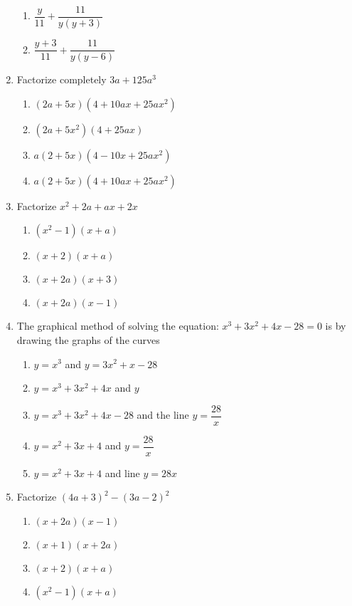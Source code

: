 \begin{multicols}{2}
\begin{enumerate}[label={\arabic*.}]
\begin{enumerate}[label={\Alph*.}]
        \item \(\dfrac{y}{11} + \dfrac{11}{y(y+3)}\)
        \item \(\dfrac{y+3}{11}+\dfrac{11}{y(y-6)}\)
      \end{enumerate}
    \item Factorize completely \(3a+125a^3\)
      \begin{enumerate}[label={\Alph*.}]
        \item \((2a+5x)(4+10ax + 25a{x}^{2})\)
        \item \((2a+5{x}^{2})(4+25ax)\)
        \item \(a(2+5x)(4-10x+25a{x}^{2})\)
        \item \(a(2+5x)(4+10ax+25a{x}^{2})\)
      \end{enumerate}
    \item Factorize \({x}^{2}+2a+ax+2x\)
      \begin{enumerate}[label={\Alph*.}]
        \item \(({x}^{2}-1)(x+a)\)
        \item \((x+2)(x+a)\)
        \item \((x+2a)(x+3)\)
        \item \((x+2a)(x-1)\)
      \end{enumerate}
    \item The graphical method of solving the equation: \({x}^{3}+3{x}^{2}+4x-28 = 0\) is by drawing the graphs of the curves
      \begin{enumerate}[label={\Alph*.}]
        \item \(y = {x}^{3}\) and \(y=3{x}^{2} + x -28\)
        \item \(y = {x}^{3}+3{x}^{2}+4x\) and \(y\)
        \item \(y = {x}^{3}+3{x}^{2}+4x-28\) and the line \(y=\dfrac{28}{x}\)
        \item \(y = {x}^{2}+3x+4\) and \(y = \dfrac{28}{x}\)
        \item \(y = {x}^{2}+3x+4\) and line \(y = 28x\)
      \end{enumerate}
    \item Factorize \({(4a+3)}^2-{(3a-2)}^2\)
      \begin{enumerate}[label={\Alph*.}]
        \item \((x+2a)(x-1)\)
        \item \((x+1)(x+2a)\)
        \item \((x+2)(x+a)\)
        \item \(({x}^{2}-1)(x+a)\)
      \end{enumerate}

\end{enumerate}
\end{multicols}
